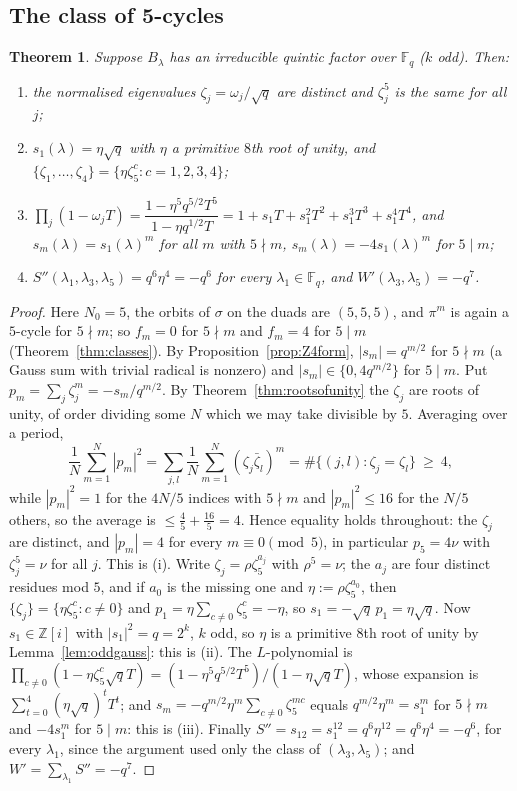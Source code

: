 ﻿\documentclass[12pt,a4paper]{amsart}
\newtheorem{theorem}{Theorem}[section]
\theoremstyle{definition}
\newcommand{\F}{\mathbb{F}}
\newcommand{\Z}{\mathbb{Z}}
\newcommand{\Spp}{S''}
\begin{document}
\subsection{The class of 5-cycles}
\begin{theorem}\label{thm:fivecycle}
Suppose $B_\lambda$ has an irreducible quintic factor over $\F_q$ ($k$ odd). Then:
\begin{enumerate}[label=\textup{(\roman*)},leftmargin=2em]
\item the normalised eigenvalues $\zeta_j=\omega_j/\sqrt q$ are distinct and $\zeta_j^5$ is the same for all $j$;
\item $s_1(\lambda)=\eta\sqrt q$ with $\eta$ a primitive $8$th root of unity, and $\{\zeta_1,\dots,\zeta_4\}=\{\eta\zeta_5^c:c=1,2,3,4\}$;
\item $\prod_j(1-\omega_jT)=\dfrac{1-\eta^5q^{5/2}T^5}{1-\eta q^{1/2}T}=1+s_1T+s_1^2T^2+s_1^3T^3+s_1^4T^4$, and $s_m(\lambda)=s_1(\lambda)^m$ for all $m$ with $5\nmid m$, $s_m(\lambda)=-4s_1(\lambda)^m$ for $5\mid m$;
\item $\Spp(\lambda_1,\lambda_3,\lambda_5)=q^6\eta^4=-q^6$ for every $\lambda_1\in\F_q$, and $W'(\lambda_3,\lambda_5)=-q^7$.
\end{enumerate}
\end{theorem}
\begin{proof}
Here $N_0=5$, the orbits of $\sigma$ on the duads are $(5,5,5)$, and $\pi^m$ is again a $5$-cycle for $5\nmid m$; so $f_m=0$ for $5\nmid m$ and $f_m=4$ for $5\mid m$ (Theorem~\ref{thm:classes}). By Proposition~\ref{prop:Z4form}, $|s_m|=q^{m/2}$ for $5\nmid m$ (a Gauss sum with trivial radical is nonzero) and $|s_m|\in\{0,4q^{m/2}\}$ for $5\mid m$. Put $p_m=\sum_j\zeta_j^m=-s_m/q^{m/2}$. By Theorem~\ref{thm:rootsofunity} the $\zeta_j$ are roots of unity, of order dividing some $N$ which we may take divisible by $5$. Averaging over a period,
\[
\frac1N\sum_{m=1}^N|p_m|^2=\sum_{j,l}\frac1N\sum_{m=1}^N(\zeta_j\bar\zeta_l)^m=\#\{(j,l):\zeta_j=\zeta_l\}\ \ge\ 4 ,
\]
while $|p_m|^2=1$ for the $4N/5$ indices with $5\nmid m$ and $|p_m|^2\le16$ for the $N/5$ others, so the average is $\le\frac45+\frac{16}5=4$. Hence equality holds throughout: the $\zeta_j$ are distinct, and $|p_m|=4$ for every $m\equiv0\pmod5$, in particular $p_5=4\nu$ with $\zeta_j^5=\nu$ for all $j$. This is (i). Write $\zeta_j=\rho\zeta_5^{a_j}$ with $\rho^5=\nu$; the $a_j$ are four distinct residues mod $5$, and if $a_0$ is the missing one and $\eta:=\rho\zeta_5^{a_0}$, then $\{\zeta_j\}=\{\eta\zeta_5^c:c\ne0\}$ and $p_1=\eta\sum_{c\ne0}\zeta_5^c=-\eta$, so $s_1=-\sqrt q\,p_1=\eta\sqrt q$. Now $s_1\in\Z[i]$ with $|s_1|^2=q=2^k$, $k$ odd, so $\eta$ is a primitive $8$th root of unity by Lemma~\ref{lem:oddgauss}: this is (ii). The $L$-polynomial is $\prod_{c\ne0}(1-\eta\zeta_5^c\sqrt qT)=(1-\eta^5q^{5/2}T^5)/(1-\eta\sqrt qT)$, whose expansion is $\sum_{t=0}^4(\eta\sqrt q)^tT^t$; and $s_m=-q^{m/2}\eta^m\sum_{c\ne0}\zeta_5^{mc}$ equals $q^{m/2}\eta^m=s_1^m$ for $5\nmid m$ and $-4s_1^m$ for $5\mid m$: this is (iii). Finally $\Spp=s_{12}=s_1^{12}=q^6\eta^{12}=q^6\eta^4=-q^6$, for every $\lambda_1$, since the argument used only the class of $(\lambda_3,\lambda_5)$; and $W'=\sum_{\lambda_1}\Spp=-q^7$.
\end{proof}
\end{document}
